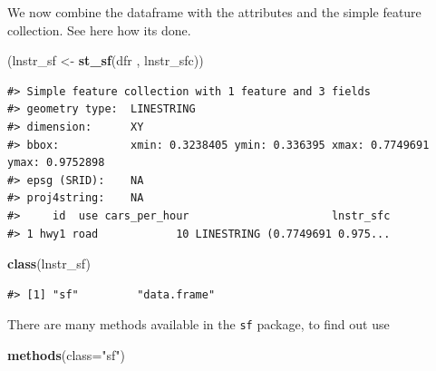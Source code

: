 \documentclass[]{book}
\newenvironment{Shaded}{\begin{snugshade}}{\end{snugshade}}
\newcommand{\KeywordTok}[1]{\textcolor[rgb]{0.13,0.29,0.53}{\textbf{#1}}}
\newcommand{\DataTypeTok}[1]{\textcolor[rgb]{0.13,0.29,0.53}{#1}}
\newcommand{\StringTok}[1]{\textcolor[rgb]{0.31,0.60,0.02}{#1}}
\newcommand{\NormalTok}[1]{#1}
\theoremstyle{definition}
\theoremstyle{definition}
\theoremstyle{definition}
\theoremstyle{remark}
\begin{document}
We now combine the dataframe with the attributes and the simple feature
collection. See here how its done.

\begin{Shaded}
\begin{Highlighting}[]
\NormalTok{(lnstr_sf <-}\StringTok{ }\KeywordTok{st_sf}\NormalTok{(dfr , lnstr_sfc))}
\end{Highlighting}
\end{Shaded}

\begin{verbatim}
#> Simple feature collection with 1 feature and 3 fields
#> geometry type:  LINESTRING
#> dimension:      XY
#> bbox:           xmin: 0.3238405 ymin: 0.336395 xmax: 0.7749691 ymax: 0.9752898
#> epsg (SRID):    NA
#> proj4string:    NA
#>     id  use cars_per_hour                      lnstr_sfc
#> 1 hwy1 road            10 LINESTRING (0.7749691 0.975...
\end{verbatim}

\begin{Shaded}
\begin{Highlighting}[]
\KeywordTok{class}\NormalTok{(lnstr_sf)}
\end{Highlighting}
\end{Shaded}

\begin{verbatim}
#> [1] "sf"         "data.frame"
\end{verbatim}

There are many methods available in the \texttt{sf} package, to find out
use

\begin{Shaded}
\begin{Highlighting}[]
\KeywordTok{methods}\NormalTok{(}\DataTypeTok{class=}\StringTok{"sf"}\NormalTok{)}
\end{Highlighting}
\end{Shaded}
\end{document}
